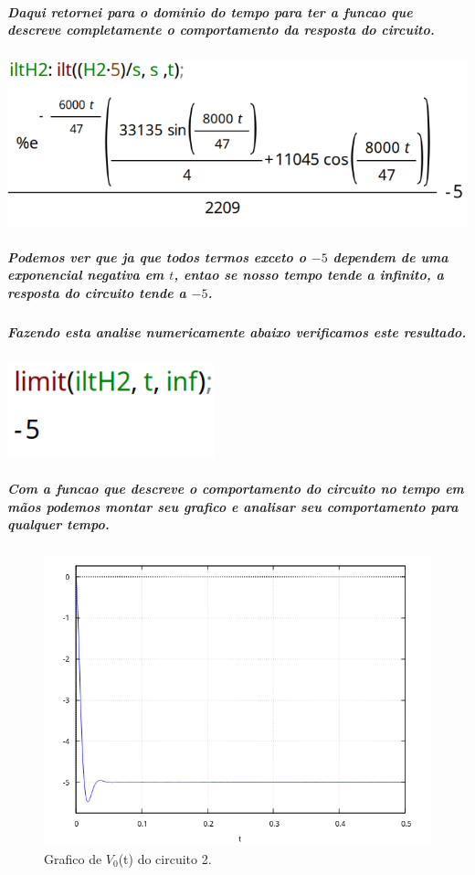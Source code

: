 \documentclass[12pt,twoside, a4paper, twocolumn]{article}
\begin{document}
\pagebreak

\subparagraph*{Daqui retornei para o dominio do tempo para ter a funcao que descreve completamente o comportamento  da resposta do circuito.}

\subparagraph*{}


\begin{adjustbox}{scale=0.35}
    \includegraphics{iltH2.png}
\end{adjustbox}


\subparagraph*{Podemos ver que ja que todos termos exceto o $-5$ dependem de uma exponencial negativa em $t$, entao se nosso tempo tende a infinito, a resposta do circuito tende a $-5$.}

\subparagraph*{Fazendo esta analise numericamente abaixo verificamos este resultado.}

\subparagraph*{}

\begin{adjustbox}{scale=0.4}
    \includegraphics{limH2.png}
\end{adjustbox}

\subparagraph*{Com a funcao que descreve o comportamento do circuito no tempo em mãos podemos montar seu grafico e analisar seu comportamento para qualquer tempo.}

\newpage

\begin{figure}[h]
    \centering
    \includegraphics[width=1\columnwidth]{images/graficoH2t.png}
    \caption{Grafico de $V_0$(t) do circuito 2.}
\end{figure}
\end{document}
